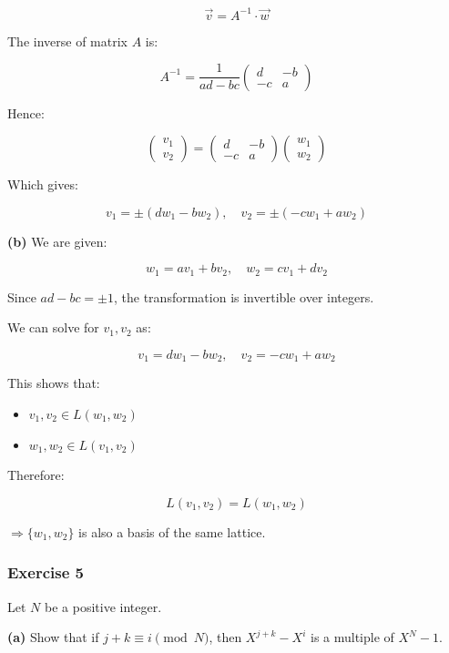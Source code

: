 \documentclass[a4paper,12pt]{article}
\begin{document}
\[
\vec{v} = A^{-1} \cdot \vec{w}
\]

The inverse of matrix \(A\) is:

\[
A^{-1} =
\frac{1}{ad - bc}
\begin{pmatrix}
d & -b \\
-c & a
\end{pmatrix}
\]

Hence:

\[
\begin{pmatrix}
v_1 \\
v_2
\end{pmatrix}
=
\begin{pmatrix}
d & -b \\
-c & a
\end{pmatrix}
\begin{pmatrix}
w_1 \\
w_2
\end{pmatrix}
\]

Which gives:

\[
v_1 = \pm (d w_1 - b w_2), \quad v_2 = \pm (-c w_1 + a w_2)
\]

\textbf{(b)} We are given:

\[
w_1 = a v_1 + b v_2, \quad w_2 = c v_1 + d v_2
\]

Since \(ad - bc = \pm 1\), the transformation is invertible over
integers.

We can solve for \(v_1, v_2\) as:

\[
v_1 = d w_1 - b w_2, \quad v_2 = -c w_1 + a w_2
\]

This shows that:

\begin{itemize}
\tightlist
\item
  \(v_1, v_2 \in L(w_1, w_2)\)
\item
  \(w_1, w_2 \in L(v_1, v_2)\)
\end{itemize}

Therefore:

\[
L(v_1, v_2) = L(w_1, w_2)
\]

\(\Rightarrow \{w_1, w_2\}\) is also a basis of the same lattice.

    \subsubsection{Exercise 5}\label{exercise-5}

Let \(N\) be a positive integer.

\textbf{(a)} Show that if \(j + k \equiv i \pmod{N}\), then
\(X^{j+k} - X^i\) is a multiple of \(X^N - 1\).
\end{document}
